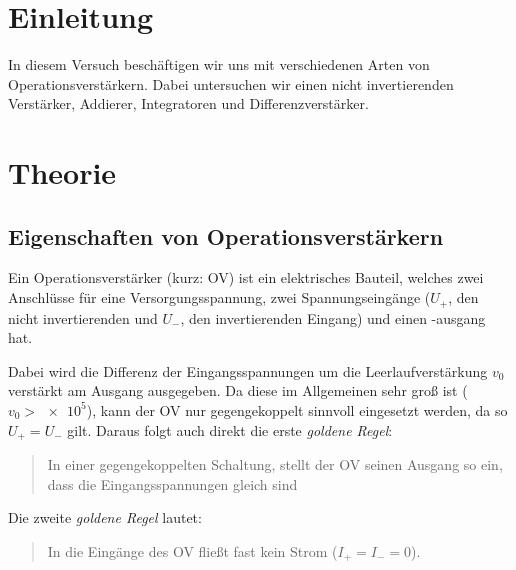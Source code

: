 \FloatBarrier
\section{Einleitung}

In diesem Versuch beschäftigen wir uns mit verschiedenen Arten von
Operationsverstärkern. Dabei untersuchen wir einen nicht invertierenden
Verstärker, Addierer, Integratoren und Differenzverstärker.


\FloatBarrier
\section{Theorie}

\subsection{Eigenschaften von Operationsverstärkern}

Ein Operationsverstärker (kurz: OV) ist ein elektrisches Bauteil, welches zwei
Anschlüsse für eine Versorgungsspannung, zwei Spannungseingänge ($U_+$, den
nicht invertierenden und $U_-$, den invertierenden Eingang) und einen
-ausgang hat.

Dabei wird die Differenz der Eingangsspannungen um die Leerlaufverstärkung
$v_0$ verstärkt am Ausgang ausgegeben. Da diese im Allgemeinen sehr groß ist
($v_0 > \num{e5}$), kann der OV nur gegengekoppelt sinnvoll eingesetzt werden,
da so $U_+ = U_-$ gilt. Daraus folgt auch direkt die erste \emph{goldene
Regel}:
\begin{quote}
    In einer gegengekoppelten Schaltung, stellt der OV seinen Ausgang so ein,
    dass die Eingangsspannungen gleich sind
\end{quote}
Die zweite \emph{goldene Regel} lautet:
\begin{quote}
    In die Eingänge des OV fließt fast kein Strom ($I_+ = I_- = 0$).
\end{quote}


